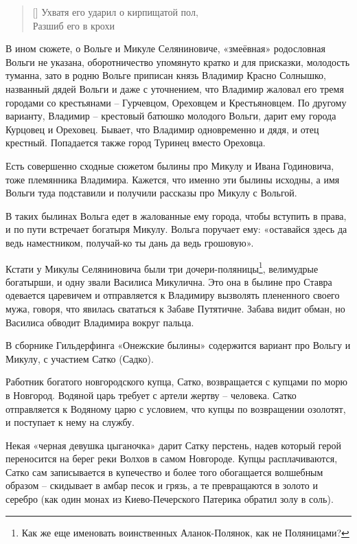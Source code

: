 \settowidth{\versewidth}{Ухватя его ударил о кирпищатой пол,} 
\begin{verse}[\versewidth]
Ухватя его ударил о кирпищатой пол,\\
Разшиб его в крохи
\end{verse}

В ином сюжете, о Вольге и Микуле Селяниновиче, «змеёвная» родословная Вольги не указана, оборотничество упомянуто кратко и для присказки, молодость туманна, зато в родню Вольге приписан князь Владимир Красно Солнышко, названный дядей Вольги и даже с уточнением, что Владимир жаловал его тремя городами со крестьянами – Гурчевцом, Ореховцем и Крестьяновцем. По другому варианту, Владимир – крестовый батюшко молодого Вольги,  дарит ему города Курцовец и Ореховец. Бывает, что Владимир одновременно и дядя, и отец крестный. Попадается также город Туринец вместо Ореховца. 

Есть совершенно сходные сюжетом былины про Микулу и Ивана Годиновича, тоже племянника Владимира. Кажется, что именно эти былины исходны, а имя Вольги туда подставили и получили рассказы про Микулу с Вольгой.

В таких былинах Вольга едет в жалованные ему города, чтобы вступить в права, и по пути встречает богатыря Микулу. Вольга поручает ему: «оставайся здесь да ведь наместником, получай-ко ты дань да ведь грошовую».

Кстати у Микулы Селяниновича были три дочери-поляницы\footnote{Как же еще именовать воинственных Аланок-Полянок, как не Поляницами?}, велимудрые богатырши, и одну звали Василиса Микулична. Это она в былине про Ставра одевается царевичем и отправляется к Владимиру вызволять плененного своего мужа, говоря, что явилась свататься к Забаве Путятичне. Забава видит обман, но Василиса обводит Владимира вокруг пальца. 

В сборнике Гильдерфинга «Онежские былины»\cite{gilder01} содержится вариант про Вольгу и Микулу, с участием Сатко (Садко).

Работник богатого новгородского купца, Сатко, возвращается с купцами по морю в Новгород. Водяной царь требует с артели жертву – человека. Сатко отправляется к Водяному царю с условием, что купцы по возвращении озолотят, и поступает к нему на службу. 

Некая «черная девушка цыганочка» дарит Сатку перстень, надев который герой переносится на берег реки Волхов в самом Новгороде. Купцы расплачиваются, Сатко сам записывается в купечество и более того обогащается волшебным образом – скидывает в амбар песок и грязь, а те превращаются в золото и серебро (как один монах из Киево-Печерского Патерика обратил золу в соль). 

